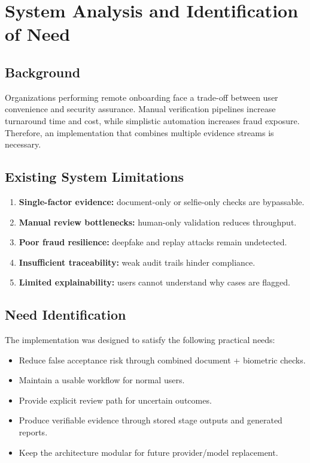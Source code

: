 \chapter{System Analysis and Identification of Need}

\section{Background}
Organizations performing remote onboarding face a trade-off between user convenience and security assurance. Manual verification pipelines increase turnaround time and cost, while simplistic automation increases fraud exposure. Therefore, an implementation that combines multiple evidence streams is necessary.

\section{Existing System Limitations}
\begin{enumerate}[label=\textbf{L\arabic*:}]
\item \textbf{Single-factor evidence:} document-only or selfie-only checks are bypassable.
\item \textbf{Manual review bottlenecks:} human-only validation reduces throughput.
\item \textbf{Poor fraud resilience:} deepfake and replay attacks remain undetected.
\item \textbf{Insufficient traceability:} weak audit trails hinder compliance.
\item \textbf{Limited explainability:} users cannot understand why cases are flagged.
\end{enumerate}

\section{Need Identification}
The implementation was designed to satisfy the following practical needs:
\begin{itemize}
\item Reduce false acceptance risk through combined document + biometric checks.
\item Maintain a usable workflow for normal users.
\item Provide explicit review path for uncertain outcomes.
\item Produce verifiable evidence through stored stage outputs and generated reports.
\item Keep the architecture modular for future provider/model replacement.
\end{itemize}

